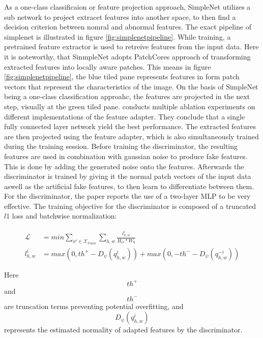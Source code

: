 As a one-class classificaion or feature projection approach, SimpleNet utilizes a sub network to project extracet features into another space, to then find a decision criterion between nomral and 
abnormal features. The exact pipeline of simplenet is illustrated in figure \ref{fig:simplenetpipeline}. While training, a pretrained feature extractor is used to retreive features from the input data. Here it is noteworthy, 
that SinmpleNet adopts PatchCores approach of transforming extracted features into locally aware patches. This means in figure \ref{fig:simplenetpipeline}, the blue tiled pane represents features in form patch vectors 
that represent the characteristics of the image. On the basis of SimpleNet being a one-class classification approahc, the features are projected in the next step, visually at the green tiled pane. 
\cite{liu2023simplenet} conducts multiple ablation experiments on different implementations of the feature adapter. They conclude that a single fully connected layer network yield the best 
performance. The extracted features are then projected using the feature adapter, which is also simultaneously trained during the training session. Before training the discriminator, the resulting 
features are used in combination with gaussian noise to produce fake features. This is done by adding the generated noise onto the features. Afterwards the discriminator is trained by giving it 
the normal patch vectors of the input data aswell as the artificial fake features, to then learn to differentiate between them. For the discriminator, the paper reports the use of a two-layer 
MLP to be very effective. The training objective for the discriminator is composed of a truncated $l1$ loss and batchwise normalization:

\begin{equation}
    \label{eq:simplenetloss}
    \begin{split}
        \mathcal{L} &= min \sum_{x^{i}\in \mathcal{X}_{train}} \sum_{h, w} \frac{l^{i}_{h,w}}{H_{O} * W_{0}} \\
        l^{i}_{h,w} &= max(0, th^{+} - D_{\psi}(q^{i}_{h,w})) + max(0, -th^{-} - D_{\psi}(q^{-i}_{h,w}))
    \end{split}
\end{equation}    

Here $$th^{+}$$ and $$th^{-}$$ are truncation terms preventing potential overfitting, and $$D_{\psi}(q^{i}_{h,w})$$ represents the estimated normality of adapted features by the discriminator.

